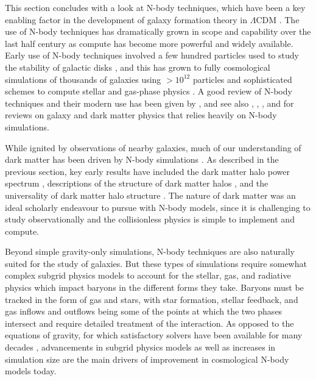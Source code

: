 This section concludes with a look at N-body techniques, which have been a key enabling factor in the development of galaxy formation theory in $\Lambda$CDM \parencite{frenk12}. The use of N-body techniques has dramatically grown in scope and capability over the last half century as compute has become more powerful and widely available. Early use of N-body techniques involved a few hundred particles used to study the stability of galactic disks \parencite[e.g.][]{ostriker73}, and this has grown to fully cosmological simulations of thousands of galaxies using $> 10^{12}$ particles and sophisticated schemes to compute stellar and gas-phase physics \parencite[e.g.][]{eagle_model_crain15,wetzel16,tng_model_pillepich18}. A good review of N-body techniques and their modern use has been given by \textcite{crain23}, and see also \textcite{frenk12}, \textcite{somerville15}, \textcite{bullock17}, and \textcite{wechsler18} for reviews on galaxy and dark matter physics that relies heavily on N-body simulations.

While ignited by observations of nearby galaxies, much of our understanding of dark matter has been driven by N-body simulations \parencite{frenk12}. As described in the previous section, key early results have included the dark matter halo power spectrum \parencite{press74}, descriptions of the structure of dark matter halos \parencite{efstathiou88,dubinski91}, and the universality of dark matter halo structure \parencite{navarro96,navarro97}. The nature of dark matter was an ideal scholarly endeavour to pursue with N-body models, since it is challenging to study observationally and the collisionless physics is simple to implement and compute. 

Beyond simple gravity-only simulations, N-body techniques are also naturally suited for the study of galaxies. But these types of simulations require somewhat complex subgrid physics models to account for the stellar, gas, and radiative physics which impact baryons in the different forms they take. Baryons must be tracked in the form of gas and stars, with star formation, stellar feedback, and gas inflows and outflows being some of the points at which the two phases intersect and require detailed treatment of the interaction. As opposed to the equations of gravity, for which satisfactory solvers have been available for many decades \parencite[e.g.][]{barnes86}, advancements in subgrid physics models as well as increases in simulation size are the main drivers of improvement in cosmological N-body models today.

